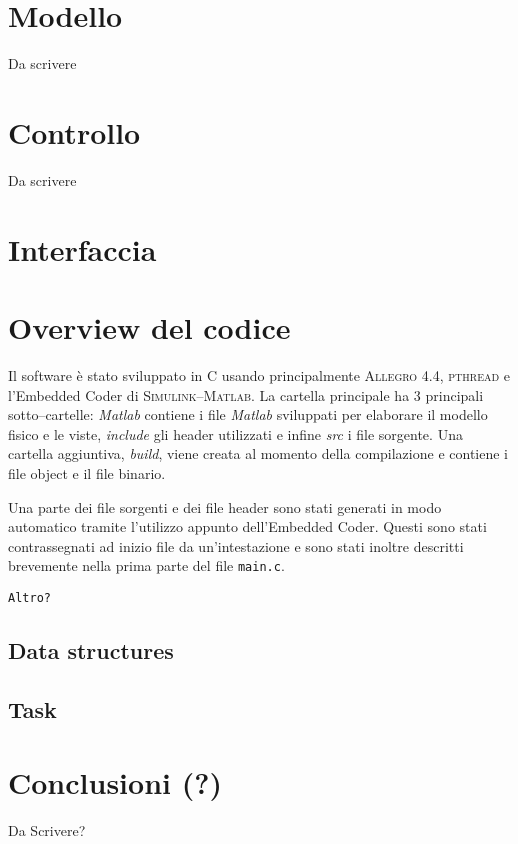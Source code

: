 

\section{Modello}
\label{sez:modello}
Da scrivere

\section{Controllo}
\label{sez:controllo}
Da scrivere

\section{Interfaccia}



\section{Overview del codice}

Il software \`e stato sviluppato in C usando principalmente \textsc{Allegro} 4.4, \textsc{pthread} e l'Embedded Coder di \textsc{Simulink--Matlab}. La cartella principale ha 3 principali sotto--cartelle: \textit{Matlab} contiene i file \textit{Matlab} sviluppati per elaborare il modello fisico e le viste, \textit{include} gli header utilizzati e infine \textit{src} i file sorgente. Una cartella aggiuntiva, \textit{build}, viene creata al momento della compilazione e contiene i file object e il file binario.

Una parte dei file sorgenti e dei file header sono stati generati in modo automatico tramite l'utilizzo appunto dell'Embedded Coder. Questi sono stati contrassegnati ad inizio file da un'intestazione e sono stati inoltre descritti brevemente nella prima parte del file \texttt{main.c}.

\texttt{Altro?}

\subsection{Data structures}


\subsection{Task}

\FloatBarrier

\section{Conclusioni (?)}
Da Scrivere?

	
